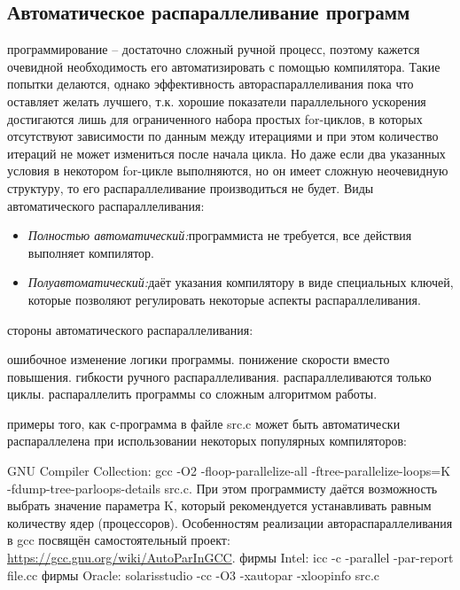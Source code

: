 { %
	\subsection{Автоматическое распараллеливание программ}
	 программирование – достаточно сложный ручной процесс, поэтому кажется очевидной необходимость его автоматизировать с помощью компилятора. Такие попытки делаются, однако эффективность автораспараллеливания пока что оставляет желать лучшего, т.к. хорошие показатели параллельного ускорения достигаются лишь для ограниченного набора простых for-циклов, в которых отсутствуют зависимости по данным между итерациями и при этом количество итераций не может измениться после начала цикла. Но даже если два указанных условия в некотором for-цикле выполняются, но он имеет сложную неочевидную структуру, то его распараллеливание производиться не будет. Виды автоматического распараллеливания:
	\begin{itemize}
		\item\textit{Полностью автоматический:} программиста не требуется, все действия выполняет компилятор.
		\item\textit{Полуавтоматический:} даёт указания компилятору в виде специальных ключей, которые позволяют регулировать некоторые аспекты распараллеливания.
	\end{itemize}
	 стороны автоматического распараллеливания:
	\begin{itemize}
		 ошибочное изменение логики программы.
		 понижение скорости вместо повышения.
		 гибкости ручного распараллеливания.
		 распараллеливаются только циклы.
		 распараллелить программы со сложным алгоритмом работы.
	\end{itemize}
	 примеры того, как с-программа в файле src.c может быть автоматически распараллелена при использовании некоторых популярных компиляторов:
	\begin{itemize}
		 GNU Compiler Collection:	 
gcc -O2 -floop-parallelize-all -ftree-parallelize-loops=K -fdump-tree-parloops-details src.c. При этом программисту даётся возможность выбрать значение параметра K, который рекомендуется устанавливать равным количеству ядер (процессоров). Особенностям реализации автораспараллеливания в gcc посвящён самостоятельный проект:\\ \url{https://gcc.gnu.org/wiki/AutoParInGCC}. 
		 фирмы Intel:	 
icc -c -parallel -par-report file.cc
		 фирмы Oracle:	 
solarisstudio -cc -O3 -xautopar -xloopinfo src.c
	\end{itemize}
}